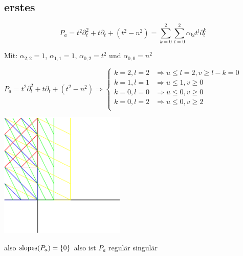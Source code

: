 \subsection{erstes}
\[
  P_a=t^2\partial_t^2+t\partial_t+(t^2-n^2)=\sum_{k=0}^2\sum_{l=0}^2
  \alpha_{kl}t^l\partial_t^k
\]

Mit: $\alpha_{2,2}=1$, $\alpha_{1,1}=1$, $\alpha_{0,2}=t^2$ und
$\alpha_{0,0}=n^2$

$
P_a=t^2\partial_t^2+t\partial_t+(t^2-n^2) \Rightarrow 
\begin{cases}
  k=2,l=2 & \Rightarrow u\leq l=2, v\geq l-k=0\\
  k=1,l=1 & \Rightarrow u\leq 1, v\geq 0\\
  k=0,l=0 & \Rightarrow u\leq 0, v\geq 0\\
  k=0,l=2 & \Rightarrow u\leq 0, v\geq 2\\
\end{cases}
$

\begin{center}
  \includegraphics[width=6cm]{beispiele/img/a.png}
\end{center}
also $\operatorname{slopes}(P_a)=\{0\}$ also ist $P_a$ regulär singulär

